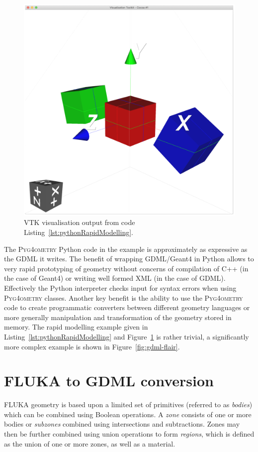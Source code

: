 \documentclass[final,5p,times,twocolumn]{elsarticle}
\newcommand{\PYGEOMETRY}{\textsc{Pyg4ometry}}
\begin{document}
\begin{figure}[htbp]
\begin{center}
\includegraphics[width=0.9\columnwidth]{./diagrams/rapidModelling.pdf}
\caption{VTK visualisation output from code Listing~\ref{lst:pythonRapidModelling}.}
\label{fig:rapidModellingExample}
\end{center}
\end{figure}

The \PYGEOMETRY{} Python code in the example is approximately as expressive 
as the GDML it writes. The benefit of wrapping GDML/Geant4 in Python allows 
to very rapid prototyping of geometry without concerns of compilation of C++ (in the 
case of Geant4) or writing well formed XML (in the case of GDML). Effectively
the Python interpreter checks input for syntax errors when using \PYGEOMETRY{} classes. 
Another key benefit is the ability to use the \PYGEOMETRY{} code to create 
programmatic converters between different geometry languages or more generally 
manipulation and transformation of the geometry stored in memory. The rapid modelling 
example given in Listing~\ref{lst:pythonRapidModelling} and Figure~\ref{fig:rapidModellingExample} 
is rather trivial, a significantly more complex example is shown in Figure~\ref{fig:gdml-flair}.

\section{FLUKA to GDML conversion}
FLUKA geometry is based upon a limited set of primitives (referred to as
\emph{bodies}) which can be combined using Boolean operations. A
\emph{zone} consists of one or more bodies or \emph{subzones} combined
using intersections and subtractions.  Zones may then be further combined
using union operations to form \emph{regions}, which is defined as the
union of one or more zones, as well as a material.
\end{document}
